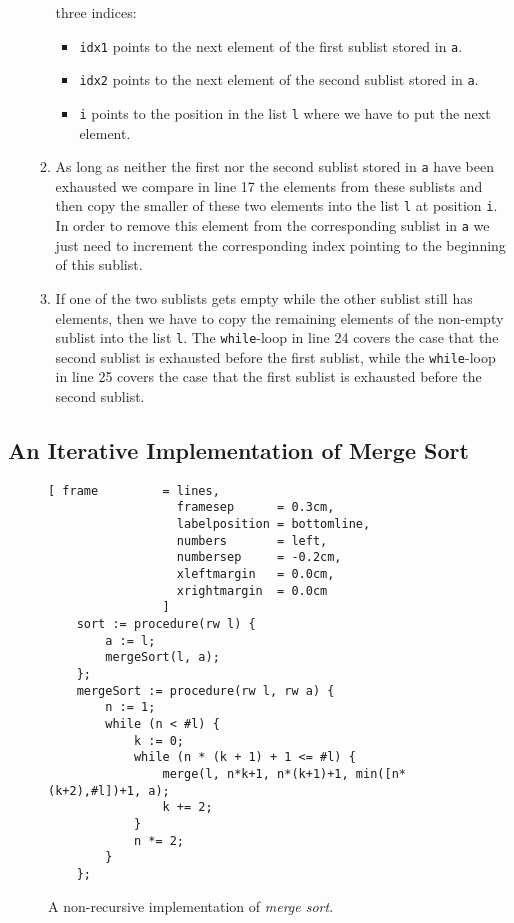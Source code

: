 \begin{enumerate}
\begin{enumerate}
            three indices: 
            \begin{itemize}
            \item \texttt{idx1} points to the next element of the first sublist stored in \texttt{a}.
            \item \texttt{idx2} points to the next element of the second sublist stored in \texttt{a}.
            \item \texttt{i} points to the position in the list \texttt{l} where we have to put the next
                       element.
            \end{itemize}
      \item As long as neither the first nor the second sublist stored in \texttt{a} have been exhausted
            we compare in line 17 the elements from these sublists and then copy the smaller of these
            two elements into the list \texttt{l} at position \texttt{i}.
            In order to remove this element from the corresponding sublist in \texttt{a} we just need to
            increment the corresponding index pointing to the beginning of this sublist.
      \item If one of the two sublists gets empty while the other sublist still has elements, then we have
            to copy the remaining elements of the non-empty sublist into the list \texttt{l}.
            The \texttt{while}-loop in line 24 covers the case that the second sublist is exhausted before 
            the first sublist, while the \texttt{while}-loop in line 25 covers the case that the first
            sublist is exhausted before the second sublist.
      \end{enumerate}
\end{enumerate}

\subsection{An Iterative Implementation of Merge Sort}

\begin{figure}[!ht]
  \centering
\begin{Verbatim}[ frame         = lines, 
                  framesep      = 0.3cm, 
                  labelposition = bottomline,
                  numbers       = left,
                  numbersep     = -0.2cm,
                  xleftmargin   = 0.0cm,
                  xrightmargin  = 0.0cm
                ]
    sort := procedure(rw l) {
        a := l;
        mergeSort(l, a);
    };    
    mergeSort := procedure(rw l, rw a) {
        n := 1;
        while (n < #l) {
            k := 0;
            while (n * (k + 1) + 1 <= #l) {
                merge(l, n*k+1, n*(k+1)+1, min([n*(k+2),#l])+1, a);
                k += 2;    
            }
            n *= 2;
        }
    };
\end{Verbatim}
\vspace*{-0.3cm}
  \caption{A non-recursive implementation of \emph{merge sort}.}
  \label{fig:merge-sort-nr.stlx}
\end{figure}

